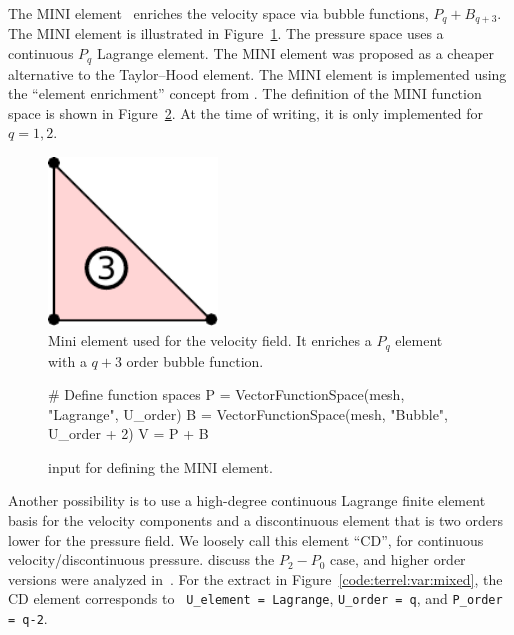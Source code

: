 The MINI element~\citep{ArnoldBrezziFortin1984} enriches the velocity
space via bubble functions, $P_q + B_{q+3}$. The MINI element is
illustrated in Figure~\ref{fig:terrel:MINIElement}.  The pressure
space uses a continuous $P_{q}$ Lagrange element.  The MINI element
was proposed as a cheaper alternative to the Taylor--Hood element. The
MINI element is implemented using the ``element enrichment'' concept
from \ufl{}. The \ufl{} definition of the MINI function space is shown
in Figure~\ref{code:terrel:MINI}.  At the time of writing, it is only
implemented for $q=1, 2$.
%
\begin{figure}
  \center
  \includegraphics[width=0.4\textwidth]{chapters/terrel/pdf/MINI.pdf}
  \caption{Mini element used for the velocity field. It enriches a $P_q$ element with
  a $q+3$ order bubble function.}
  \label{fig:terrel:MINIElement}
\end{figure}
%
\begin{figure}
\begin{python}
# Define function spaces
P = VectorFunctionSpace(mesh, "Lagrange", U_order)
B = VectorFunctionSpace(mesh, "Bubble", U_order + 2)
V = P + B
\end{python}
\caption{\ufl{} input for defining the MINI element.}
\label{code:terrel:MINI}
\end{figure}

Another possibility is to use a high-degree continuous Lagrange finite element
basis for the velocity components and a discontinuous element that is two
orders lower for the pressure field. We loosely call this element ``CD'', for
continuous velocity/discontinuous pressure.  \citet{BrezziFortin1991} discuss
the $P_2-P_0$ case, and higher order versions were analyzed
in~\citet{MadayPateraRonquist1992}. For the extract in
Figure~\ref{code:terrel:var:mixed}, the CD element corresponds to {\tt
  U\_element = Lagrange}, {\tt U\_order = q},  and {\tt P\_order = q-2}.

